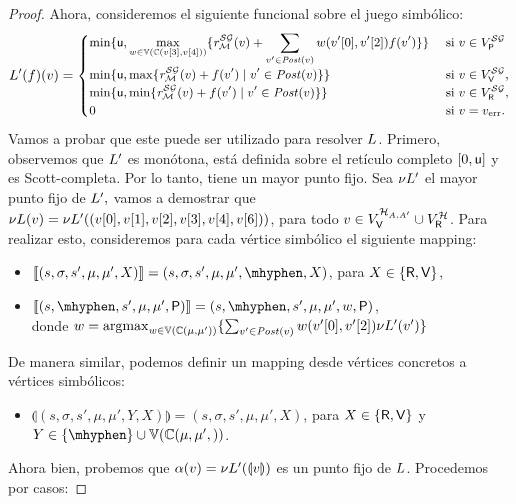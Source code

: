 \begin{proof}
    Ahora, consideremos el siguiente funcional sobre el juego simbólico:
\[\small
\Bellman'(f)(v) =
    \begin{cases}
           \displaystyle \min \{ \upperbound, \max_{w \in \vertices{\couplings{\pr{3}{v}}{\pr{4}{v}}}} \{\mreward^\SymbG(v)  + \sum_{v' \in \post(v)} w(\pr{0}{v'},\pr{2}{v'})  f(v') \} \}& \text{ si }v \in V^{\SymbG}_\Probabilistic  \\
           \displaystyle \min \{ \upperbound, \max \{\mreward^\SymbG(v)  +f(v') \mid v' \in \post(v) \} \} & \text{ si } v \in  V^{\SymbG}_\Verifier, \\
           \displaystyle \min \{ \upperbound, \min \{\mreward^\SymbG(v) + f(v') \mid v' \in \post(v) \} \} & \text{ si } v \in  V^{\SymbG}_\Refuter, \\
           \displaystyle 0 & \text{ si } v=\ErrorSt.
           \displaystyle 
    \end{cases}
\]
Vamos a probar que este puede ser utilizado para resolver $\Bellman$. Primero, observemos que $\Bellman'$ es monótona,  está definida sobre el retículo completo $[0,\upperbound]$ y es Scott-completa. Por lo tanto, tiene un mayor punto fijo.  Sea $\nu \Bellman'$ el mayor punto fijo de $\Bellman',$  vamos a demostrar que
$\nu \Bellman(v) = \nu \Bellman'((v[0],v[1],v[2],v[3],v[4], v[6]))$, para todo $v \in V^{\mathcal{H}_{A,A'}}_\Verifier \cup V^{\mathcal{H}}_\Refuter$.
Para realizar esto, consideremos para cada vértice simbólico el siguiente mapping:
\begin{itemize}
    \item $\llbracket (s,\sigma,s',\mu,\mu',X) \rrbracket = (s,\sigma,s',\mu,\mu',\mhyphen,X)$, para $X \in \{\Refuter, \Verifier\}$,
    \item $\llbracket (s,\mhyphen, s',\mu,\mu',\Probabilistic) \rrbracket =(s, \mhyphen,s', \mu,\mu', w,\Probabilistic)$,  \\ donde
              $w = \argmax_{w \in \vertices{\couplings{\mu}{\mu'}}} \{\sum_{v' \in \post(v)} w(\pr{0}{v'},\pr{2}{v'})  \nu \Bellman'(v') \}$
\end{itemize}
    De manera similar, podemos definir un mapping desde vértices concretos a vértices simbólicos:
\begin{itemize}
    \item $\llparenthesis (s,\sigma,s',\mu,\mu',Y ,X) \rrparenthesis = (s,\sigma,s',\mu,\mu',X)$, para $X \in \{\Refuter, \Verifier \}$ y $Y \in \{\mhyphen \} \cup \vertices{\couplings{\mu,\mu'}}$.
\end{itemize}
    Ahora bien, probemos que $\alpha(v) = \nu \Bellman'(\llparenthesis v \rrparenthesis)$ es un punto fijo de $\Bellman$. Procedemos por casos:
   

\end{proof}
